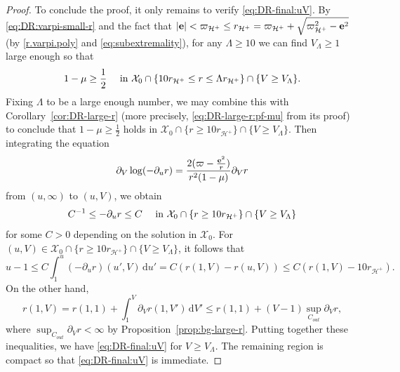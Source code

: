 \documentclass[10pt, reqno]{amsart}
\theoremstyle{definition}
\theoremstyle{remark}
\theoremstyle{conjecture}
\numberwithin{equation}{section}
\newcommand{\set}[1]{\{#1\}}
\newcommand{\ud}{\mathrm{d}}
\newcommand{\rd}{\partial}
\newcommand{\0}{\emptyset}
\newcommand{\Lmb}{\Lambda}
\newcommand{\bfe}{{\bf e}}
\newcommand{\calH}{\mathcal H}
\newcommand{\calX}{\mathcal X}
\newcommand{\EH}{\calH^{+}}
\newcommand{\e}{\bfe}							%
\begin{document}
\begin{proof}
To conclude the proof, it only remains to verify \eqref{eq:DR-final:uV}. By \eqref{eq:DR:varpi-small-r} and the fact that $|\e| < \varpi_{\EH} \leq r_{\EH} = \varpi_{\EH} + \sqrt{\varpi_{\EH}^{2} - \e^{2}}$ (by \eqref{r.varpi.poly} and \eqref{eq:subextremality}), for any $\Lmb \geq 10$ we can find $V_{\Lmb} \geq 1$ large enough so that 
\begin{equation*}
1-\mu \geq \frac{1}{2} \quad \hbox{ in } \calX_{0} \cap \set{10 r_{\EH} \leq r \leq \Lmb r_{\EH}} \cap \set{V \geq V_{\Lmb}}.
\end{equation*}
Fixing $\Lmb$ to be a large enough number, we may combine this with Corollary~\ref{cor:DR-large-r} (more precisely, \eqref{eq:DR-large-r:pf-mu} from its proof) to conclude that $1-\mu \geq \frac{1}{2}$ holds in $\calX_{0} \cap \set{r \geq 10 r_{\EH}} \cap \set{V \geq V_{\Lmb}}$. Then integrating the equation \begin{equation*}
\rd_{V} \log (-\rd_{u} r) = \frac{2 (\varpi - \frac{\e^{2}}{r})}{r^{2} (1-\mu)} \rd_{V} r
\end{equation*}
from $(u, \infty)$ to $(u, V)$, we obtain
\begin{equation*}
	C^{-1} \leq - \rd_{u} r \leq C \quad \hbox{ in } \calX_{0} \cap \set{r \geq 10 r_{\EH}} \cap \set{V \geq V_{\Lmb}}
\end{equation*}
for some $C > 0$ depending on the solution in $\calX_{0}$. For $(u, V) \in \calX_{0} \cap \set{r \geq 10 r_{\EH}} \cap \set{V \geq V_{\Lmb}}$, it follows that
\begin{equation*}
	u -1 \leq C \int_{1}^{u} (-\rd_{u} r) (u', V) \, \ud u' = C (r(1, V) - r(u, V)) \leq C (r(1, V) - 10 r_{\EH}).
\end{equation*}
On the other hand,
\begin{equation*}
	r(1, V) = r(1, 1) + \int_{1}^{V} \rd_{V} r(1, V') \, \ud V' \leq r(1, 1) + (V - 1) \sup_{C_{out}} \rd_{V} r,
\end{equation*}
where $\sup_{C_{out}} \rd_{V} r < \infty$ by Proposition~\ref{prop:bg-large-r}. Putting together these inequalities, we have \eqref{eq:DR-final:uV} for $V\geq V_{\Lmb}$. The remaining region is compact so that \eqref{eq:DR-final:uV} is immediate. \qedhere
\end{proof}
\end{document}
